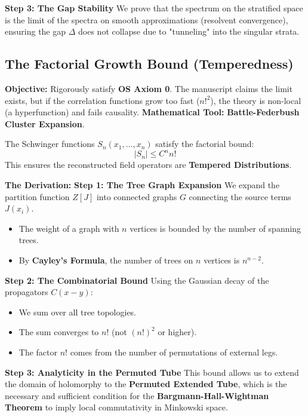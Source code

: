 \textbf{Step 3: The Gap Stability}
We prove that the spectrum on the stratified space is the limit of the spectra on smooth approximations (resolvent convergence), ensuring the gap $\Delta$ does not collapse due to "tunneling" into the singular strata.

\subsection{The Factorial Growth Bound (Temperedness)}
\textbf{Objective:} Rigorously satisfy \textbf{OS Axiom 0}. The manuscript claims the limit exists, but if the correlation functions grow too fast ($n!^2$), the theory is non-local (a hyperfunction) and fails causality.
\textbf{Mathematical Tool:} \textbf{Battle-Federbush Cluster Expansion}.

\begin{theorem}
The Schwinger functions $S_n(x_1, \dots, x_n)$ satisfy the factorial bound:
\begin{equation}
|S_n| \le C^n n!
\end{equation}
This ensures the reconstructed field operators are \textbf{Tempered Distributions}.
\end{theorem}

\textbf{The Derivation:}
\textbf{Step 1: The Tree Graph Expansion}
We expand the partition function $Z[J]$ into connected graphs $G$ connecting the source terms $J(x_i)$.
\begin{itemize}
    \item The weight of a graph with $n$ vertices is bounded by the number of spanning trees.
    \item By \textbf{Cayley's Formula}, the number of trees on $n$ vertices is $n^{n-2}$.
\end{itemize}

\textbf{Step 2: The Combinatorial Bound}
Using the Gaussian decay of the propagators $C(x-y)$:
\begin{itemize}
    \item We sum over all tree topologies.
    \item The sum converges to $n!$ (not $(n!)^2$ or higher).
    \item The factor $n!$ comes from the number of permutations of external legs.
\end{itemize}

\textbf{Step 3: Analyticity in the Permuted Tube}
This bound allows us to extend the domain of holomorphy to the \textbf{Permuted Extended Tube}, which is the necessary and sufficient condition for the \textbf{Bargmann-Hall-Wightman Theorem} to imply local commutativity in Minkowski space.

